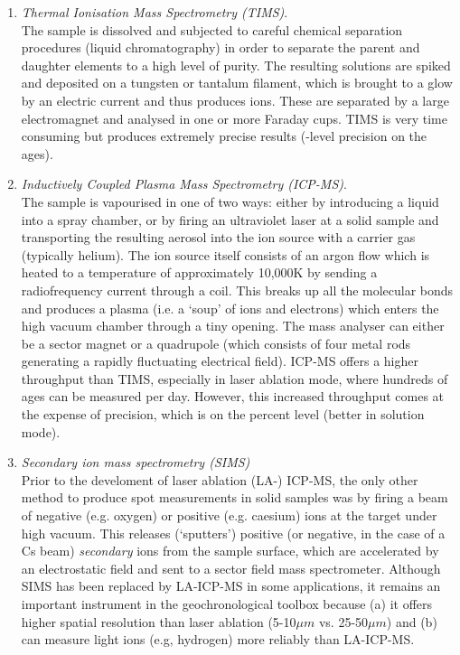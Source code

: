 \documentclass{book}
\begin{document}
\begin{enumerate}
\item{\emph{Thermal Ionisation Mass Spectrometry (TIMS)}.}\\ The
  sample is dissolved and subjected to careful chemical separation
  procedures (liquid chromatography) in order to separate the parent
  and daughter elements to a high level of purity. The resulting
  solutions are spiked and deposited on a tungsten or tantalum
  filament, which is brought to a glow by an electric current and thus
  produces ions. These are separated by a large electromagnet and
  analysed in one or more Faraday cups. TIMS is very time consuming
  but produces extremely precise results (\permil-level precision on
  the ages).
 
\item{\emph{Inductively Coupled Plasma Mass Spectrometry
    (ICP-MS)}.}\\ The sample is vapourised in one of two ways: either
  by introducing a liquid into a spray chamber, or by firing an
  ultraviolet laser at a solid sample and transporting the resulting
  aerosol into the ion source with a carrier gas (typically
  helium). The ion source itself consists of an argon flow which is
  heated to a temperature of approximately 10,000K by sending a
  radiofrequency current through a coil. This breaks up all the
  molecular bonds and produces a plasma (i.e. a `soup' of ions and
  electrons) which enters the high vacuum chamber through a tiny
  opening.  The mass analyser can either be a sector magnet or a
  quadrupole (which consists of four metal rods generating a rapidly
  fluctuating electrical field). ICP-MS offers a higher throughput
  than TIMS, especially in laser ablation mode, where hundreds of ages
  can be measured per day. However, this increased throughput comes at
  the expense of precision, which is on the percent level (better in
  solution mode).

\item{\emph{Secondary ion mass spectrometry (SIMS)}}\\ Prior to the
  develoment of laser ablation (LA-) ICP-MS, the only other method to
  produce spot measurements in solid samples was by firing a beam of
  negative (e.g. oxygen) or positive (e.g. caesium) ions at the target
  under high vacuum.  This releases (`sputters') positive (or
  negative, in the case of a Cs beam) \emph{secondary} ions from the
  sample surface, which are accelerated by an electrostatic field and
  sent to a sector field mass spectrometer. Although SIMS has been
  replaced by LA-ICP-MS in some applications, it remains an important
  instrument in the geochronological toolbox because (a) it offers
  higher spatial resolution than laser ablation (5-10$\mu m$
  vs. 25-50$\mu m$) and (b) can measure light ions (e.g, hydrogen)
  more reliably than LA-ICP-MS.


\end{enumerate}
\end{document}

